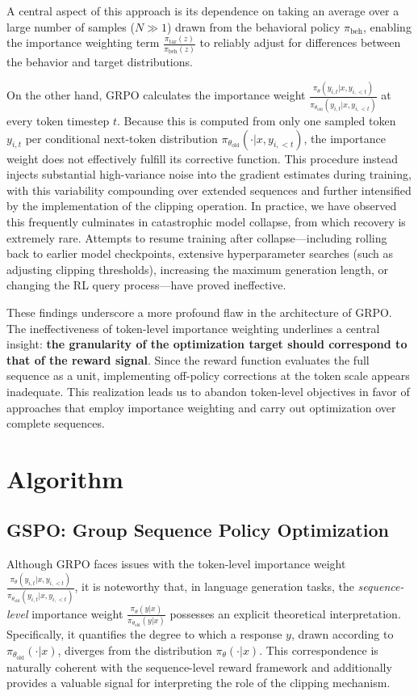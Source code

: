 A central aspect of this approach is its dependence on taking an average over a large number of samples ($N \gg 1$) drawn from the behavioral policy $\pi_\text{beh}$, enabling the importance weighting term $\frac{ \pi_\text{tar} (z) }{ \pi_\text{beh} (z)}$ to reliably adjust for differences between the behavior and target distributions.

On the other hand, GRPO calculates the importance weight $\frac{ \pi_{\theta} (y_{i,t} | x, y_{i,<t}) }{ \pi_{\theta_\text{old}} (y_{i,t} | x,y_{i,<t})}$ at every token timestep $t$. Because this is computed from only one sampled token $y_{i,t}$ per conditional next-token distribution $\pi_{\theta_\text{old}}( \cdot | x, y_{i, <t})$, the importance weight does not effectively fulfill its corrective function. This procedure instead injects substantial high-variance noise into the gradient estimates during training, with this variability compounding over extended sequences and further intensified by the implementation of the clipping operation. In practice, we have observed this frequently culminates in catastrophic model collapse, from which recovery is extremely rare. Attempts to resume training after collapse—including rolling back to earlier model checkpoints, extensive hyperparameter searches (such as adjusting clipping thresholds), increasing the maximum generation length, or changing the RL query process—have proved ineffective.

These findings underscore a more profound flaw in the architecture of GRPO. The ineffectiveness of token-level importance weighting underlines a central insight: \textbf{the granularity of the optimization target should correspond to that of the reward signal}. Since the reward function evaluates the full sequence as a unit, implementing off-policy corrections at the token scale appears inadequate. This realization leads us to abandon token-level objectives in favor of approaches that employ importance weighting and carry out optimization over complete sequences.

\section{Algorithm}

\subsection{GSPO: Group Sequence Policy Optimization}

Although GRPO faces issues with the token-level importance weight $\frac{ \pi_{\theta} (y_{i,t} | x, y_{i,<t}) }{ \pi_{\theta_\text{old}} (y_{i,t} | x,y_{i,<t})}$, it is noteworthy that, in language generation tasks, the \textit{sequence-level} importance weight $\frac{ \pi_{\theta} (y | x) }{ \pi_{\theta_\text{old}} (y | x)}$ possesses an explicit theoretical interpretation. Specifically, it quantifies the degree to which a response $y$, drawn according to $\pi_{\theta_\text{old}} (\cdot | x)$, diverges from the distribution $\pi_{\theta} (\cdot | x)$. This correspondence is naturally coherent with the sequence-level reward framework and additionally provides a valuable signal for interpreting the role of the clipping mechanism.

